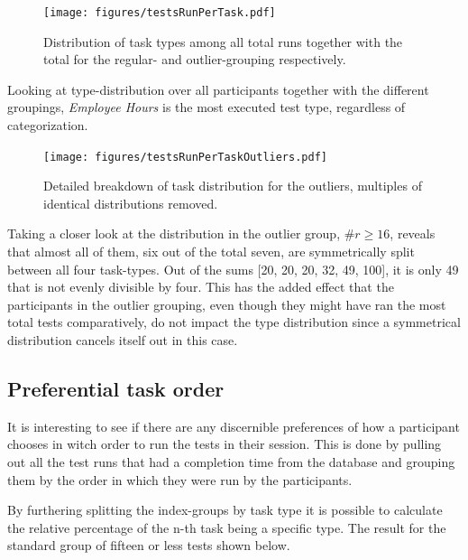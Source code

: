 \documentclass[nofilelist,dvipsnames]{cslthse-msc}
\begin{document}
				\begin{figure}[h!]
					\centering
					\texttt{[image: figures/testsRunPerTask.pdf]}
          \caption{
            Distribution of task types among all total runs together with the
            total for the regular- and outlier-grouping respectively.
          }
				\end{figure}

        Looking at type-distribution over all participants together
        with the different groupings, \textit{Employee Hours} is the most
        executed test type, regardless of categorization.

				\begin{figure}[h!]
					\centering
					\texttt{[image: figures/testsRunPerTaskOutliers.pdf]}
          \caption{
            Detailed breakdown of task distribution for the outliers, multiples
            of identical distributions removed.
          }
          \label{label_testsRunPerTaskOutliers}
				\end{figure}

        Taking a closer look at the distribution in the outlier group,
        $\#r\geq16$, reveals that almost all of them, six out of the total seven,
        are symmetrically split between all four task-types. Out of the sums
        [20, 20, 20, 32, 49, 100], it is only 49 that is not evenly divisible
        by four. This has the added effect that the participants in the
        outlier grouping, even though they might have ran the most total tests
        comparatively, do not impact the type distribution since a symmetrical
        distribution cancels itself out in this case.

      \subsection{Preferential task order}

        It is interesting to see if there are any discernible preferences
        of how a participant chooses in witch order to run the tests in their
        session. This is done by pulling out all the test runs that had a
        completion time from the database and grouping them by the order in
        which they were run by the participants.

        By furthering splitting the index-groups by task type it is possible to
        calculate the relative percentage of the n-th task being a specific
        type. The result for the standard group of fifteen or less tests shown
        below.
\end{document}
